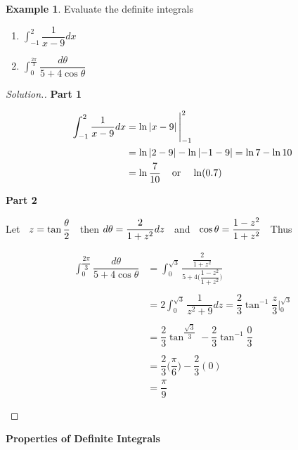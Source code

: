 \documentclass[11pt,a4paper]{article}
\theoremstyle{definition}
\newtheorem{exa}[thm]{Example}
\newenvironment{solution}
  {\renewcommand{\qedsymbol}{}\begin{proof}[\textit{Solution}.]}
  {\end{proof}}
\newcommand{\subhead}[1]{%
  \par\medskip\noindent\textbf{#1}\par\nobreak\smallskip}
\begin{document}
\begin{exa}
Evaluate the definite integrals
\begin{enumerate}
\item $\displaystyle{\int^2_{-1}\dfrac{1}{x - 9}dx}$
\item $\displaystyle{\int_0^{\frac{2\pi}{3}} \dfrac{d \theta}{5 + 4\cos \theta}}$
\end{enumerate}
\end{exa}

\begin{solution}
\subhead{Part 1}
\begin{align*}
\int^2_{-1}\dfrac{1}{x - 9}dx &  = \ln \left|x - 9\right|\Bigg|^2_{-1}\\
& = \ln\left|2 - 9\right| - \ln \left|-1 - 9\right| = \ln 7 - \ln 10\\
& = \ln \dfrac{7}{10}\hspace{0.4cm} \text{or}\hspace{0.4cm} \ln (0.7)\\
\end{align*}

\subhead{Part 2}
Let $\hspace{0.2cm} z = \tan \dfrac{\theta}{2}\hspace{0.2cm}$ then $d \theta = \dfrac{2}{1 + z^2}dz\hspace{0.2cm}$ and $\hspace{0.2cm} \cos \theta = \dfrac{1 - z^2}{1 + z^2}\hspace{0.2cm}$ Thus

\begin{align*}
\int_0^{\dfrac{2\pi}{3}} \dfrac{d \theta}{5 + 4\cos \theta} & = \int^{\sqrt{3}}_0 \frac{\dfrac{2}{1 + z^2}}{5 + 4\Bigg(\dfrac{1 - z^2}{1 + z^2}\Bigg)}\\\\
& = 2\int^{\sqrt{3}}_0 \dfrac{1}{z^2 + 9}dz
 = \dfrac{2}{3}\tan^{-1}\dfrac{z}{3}\Bigg|^{\sqrt{3}}_0\\\\
& = \dfrac{2}{3}\tan^{\dfrac{\sqrt{3}}{3}} - \dfrac{2}{3}\tan^{-1}\dfrac{0}{3}\\\\
& = \dfrac{2}{3}\Bigg(\dfrac{\pi}{6}\Bigg) - \dfrac{2}{3}(0)\\
& = \dfrac{\pi}{9}\\\\
\end{align*}
\end{solution}

\subhead{Properties of Definite Integrals}
\end{document}
